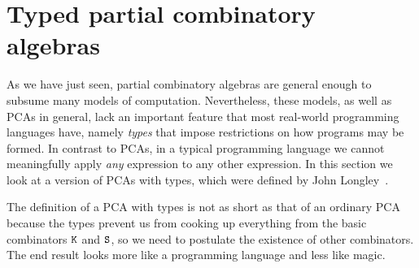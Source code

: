 
\section{Typed partial combinatory algebras}
\label{sec:tpcas}

As we have just seen, partial combinatory algebras are general enough
to subsume many models of computation. Nevertheless, these models, as
well as PCAs in general, lack an important feature that most
real-world programming languages have, namely \emph{types} that impose
restrictions on how programs may be formed. In contrast to PCAs, in a
typical programming language we cannot meaningfully apply \emph{any}
expression to any other expression. In this section we look at a
version of PCAs with types, which were defined by John
Longley~.

The definition of a PCA with types is not as short as that of an
ordinary PCA because the types prevent us from cooking up everything
from the basic combinators $\mathtt{K}$ and $\mathtt{S}$, so we need to
postulate the existence of other combinators. The end result looks
more like a programming language and less like magic.

